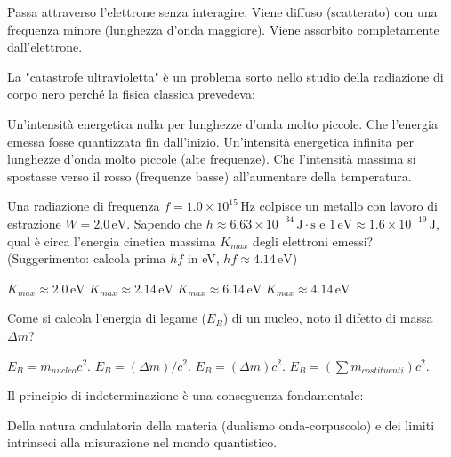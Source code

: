 \documentclass{exam}%
\begin{document}
\begin{questions}
\begin{choices}
\choice Passa attraverso l'elettrone senza interagire.%
\choice Viene diffuso (scatterato) con una frequenza minore (lunghezza d'onda maggiore).%
\choice Viene assorbito completamente dall'elettrone.%
\end{choices}%
\question La "catastrofe ultravioletta" è un problema sorto nello studio della radiazione di corpo nero perché la fisica classica prevedeva:%
\vspace{0.2em}%
\begin{choices}%
\choice Un'intensità energetica nulla per lunghezze d'onda molto piccole.%
\choice Che l'energia emessa fosse quantizzata fin dall'inizio.%
\choice Un'intensità energetica infinita per lunghezze d'onda molto piccole (alte frequenze).%
\choice Che l'intensità massima si spostasse verso il rosso (frequenze basse) all'aumentare della temperatura.%
\end{choices}%
\question Una radiazione di frequenza $f = 1.0 \times 10^{15} \, \text{Hz}$ colpisce un metallo con lavoro di estrazione $W = 2.0 \, \text{eV}$. Sapendo che $h \approx 6.63 \times 10^{-34} \, \text{J} \cdot \text{s}$ e $1 \, \text{eV} \approx 1.6 \times 10^{-19} \, \text{J}$, qual è circa l'energia cinetica massima $K_{max}$ degli elettroni emessi? (Suggerimento: calcola prima $hf$ in eV, $hf \approx 4.14 \, \text{eV}$)%
\vspace{0.2em}%
\begin{multicols}{4}%
\begin{choices}%
\choice $K_{max} \approx 2.0 \, \text{eV}$%
\choice $K_{max} \approx 2.14 \, \text{eV}$%
\choice $K_{max} \approx 6.14 \, \text{eV}$%
\choice $K_{max} \approx 4.14 \, \text{eV}$%
\end{choices}%
\end{multicols}%
\question Come si calcola l'energia di legame ($E_B$) di un nucleo, noto il difetto di massa $\Delta m$?%
\vspace{0.2em}%
\begin{multicols}{4}%
\begin{choices}%
\choice $E_B = m_{nucleo} c^2$.%
\choice $E_B = (\Delta m) / c^2$.%
\choice $E_B = (\Delta m) c^2$.%
\choice $E_B = (\sum m_{costituenti}) c^2$.%
\end{choices}%
\end{multicols}%
\question Il principio di indeterminazione è una conseguenza fondamentale:%
\vspace{0.2em}%
\begin{choices}%
\choice Della natura ondulatoria della materia (dualismo onda-corpuscolo) e dei limiti intrinseci alla misurazione nel mondo quantistico.%

\end{choices}
\end{questions}
\end{document}
